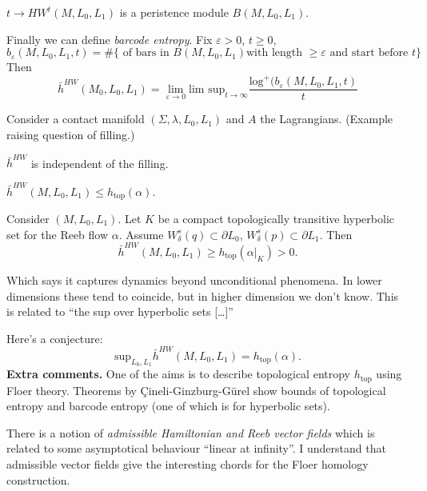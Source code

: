 \begin{proposition}
\label{proposition-persistence-module}
$t \to HW^t(M,L_0,L_1)$ is a peristence module $B(M,L_0,L_1).$
\end{proposition}

Finally we can define {\it barcode entropy}. Fix $\varepsilon>0$,
$t \geq 0$,
$$
b_\varepsilon(M,L_0,L_1,t)=
\# \{\text{ of bars in }B(M,L_0,L_1) \text{with length $\geq \varepsilon$ 
and start before $t$}\}
$$
Then
$$
\bar{h}^{HW}(M_0,L_0,L_1)=
\lim_{\varepsilon \to 0} \text{lim sup}_{t \to \infty} 
\frac{\text{log}^+(b_\varepsilon(M,L_0,L_1,t)}{t}
$$

\medskip\noindent
Consider a contact manifold $(\Sigma,\lambda,L_0,L_1)$ 
and $A$ the Lagrangians. (Example raising question of filling.)

\begin{theorem}[M '24]
\label{theorem-entropy-is-independent-of-filling}
$\bar{h}^{HW}$ is independent of the filling.
\end{theorem}

\begin{theorem}[M '24]
\label{theorem-bound}
$\bar{h}^{HW}(M,L_0,L_1) \leq  h_{\text{top}}(\alpha)$.
\end{theorem}

\begin{theorem}[M '25]
\label{theorem-restriction}
Consider $(M,L_0,L_1)$. 
Let $K$ be a compact topologically transitive hyperbolic set
for the Reeb flow $\alpha$. Assume $W_\delta ^s (q) \subset \partial L_0$,
$W_\delta^s(p) \subset \partial L_1$. Then
$$
\bar{h}^{HW}(M,L_0,L_1)\geq  h_{\text{top}}(\alpha |_{K})>0.
$$
\end{theorem}
Which says it captures dynamics beyond unconditional phenomena.
In lower dimensions these tend to coincide, but in higher dimension we don't
know. This is related to
 ``the sup over hyperbolic sets […]''

Here's a conjecture:
$$
\text{sup}_{L_0,L_1}\bar{h}^{HW}(M,L_0,L_1)=h_{\text{top}}(\alpha).
$$
\medskip\noindent
{\bf Extra comments.} 
One of the aims is to describe topological entropy $h_\text{top}$ 
using Floer theory. Theorems by Çineli-Ginzburg-Gürel show bounds
of topological entropy and barcode entropy (one of which is for
hyperbolic sets).

There is a notion of  {\it admissible Hamiltonian and Reeb vector fields}
which is related to some asymptotical behaviour  ``linear at infinity''.
I understand that admissible vector fields give 
the interesting chords for the Floer homology construction.


